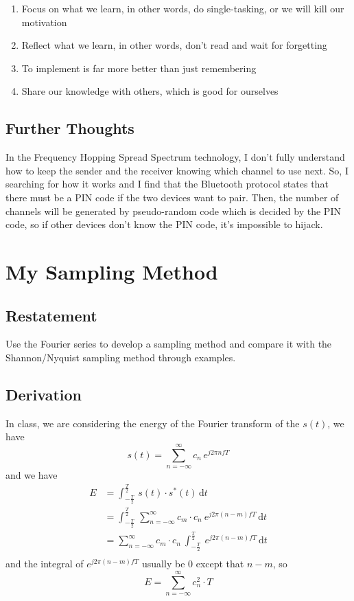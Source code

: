 \documentclass{article}
\begin{document}
\begin{enumerate}
    \item Focus on what we learn, in other words, do single-tasking, or we will kill our motivation
    \item Reflect what we learn, in other words, don't read and wait for forgetting
    \item To implement is far more better than just remembering
    \item Share our knowledge with others, which is good for ourselves
\end{enumerate}

\subsection{Further Thoughts}
In the Frequency Hopping Spread Spectrum technology, I don't fully understand how to keep the sender and the receiver knowing which channel to use next. So, I searching for how it works and I find that the Bluetooth protocol states that there must be a PIN code if the two devices want to pair. Then, the number of channels will be generated by pseudo-random code which is decided by the PIN code, so if other devices don't know the PIN  code, it's impossible to hijack.


\section{My Sampling Method}

\subsection{Restatement}
Use the Fourier series to develop a sampling method and compare it with the Shannon/Nyquist sampling method through
examples.
\subsection{Derivation}
In class, we are considering the energy of the Fourier transform of the $s(t)$, we have
\begin{equation}
s(t) = \sum_{n = -\infty}^{\infty} c_n \, e^{j2 \pi n fT}
\end{equation}
and we have
\begin{equation*}
\begin{aligned}
E &= \int_{-\frac{T}{2}}^{\frac{T}{2}} \, s(t) \cdot s^*(t) \, \mathrm{d}t \\ 
&= \int_{-\frac{T}{2}}^{\frac{T}{2}} \, \sum_{n = -\infty}^{\infty} c_m \cdot c_n ~ e^{j2 \pi (n - m) fT}  \, \mathrm{d}t \\ 
&= \sum_{n = -\infty}^{\infty} c_m \cdot c_n ~ \int_{-\frac{T}{2}}^{\frac{T}{2}} ~ e^{j2 \pi (n - m) fT}  \, \mathrm{d}t \\ 
\end{aligned}
\end{equation*}
and the integral of $e^{j2 \pi (n - m) fT}$ usually be $0$ except that $n - m$, so
$$
E =\sum_{n = -\infty}^{\infty} c_n^2 \cdot T
$$
\end{document}
